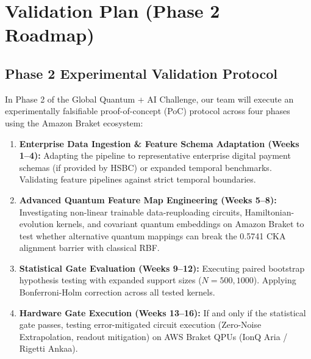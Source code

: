 \documentclass[10pt,a4paper]{article}
\begin{document}
\clearpage


\section{Validation Plan (Phase 2 Roadmap)}

\subsection{Phase 2 Experimental Validation Protocol}
In Phase 2 of the Global Quantum + AI Challenge, our team will execute an experimentally falsifiable proof-of-concept (PoC) protocol across four phases using the Amazon Braket ecosystem:
\begin{enumerate}[leftmargin=*,itemsep=0.4pt,topsep=1pt]
\item \textbf{Enterprise Data Ingestion \& Feature Schema Adaptation (Weeks 1--4):} Adapting the pipeline to representative enterprise digital payment schemas (if provided by HSBC) or expanded temporal benchmarks. Validating feature pipelines against strict temporal boundaries.
\item \textbf{Advanced Quantum Feature Map Engineering (Weeks 5--8):} Investigating non-linear trainable data-reuploading circuits, Hamiltonian-evolution kernels, and covariant quantum embeddings on Amazon Braket to test whether alternative quantum mappings can break the 0.5741 CKA alignment barrier with classical RBF.
\item \textbf{Statistical Gate Evaluation (Weeks 9--12):} Executing paired bootstrap hypothesis testing with expanded support sizes ($N=500, 1000$). Applying Bonferroni-Holm correction across all tested kernels.
\item \textbf{Hardware Gate Execution (Weeks 13--16):} If and only if the statistical gate passes, testing error-mitigated circuit execution (Zero-Noise Extrapolation, readout mitigation) on AWS Braket QPUs (IonQ Aria / Rigetti Ankaa).
\end{enumerate}
\end{document}

